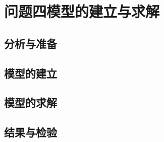 \section{问题四模型的建立与求解}

\subsection{分析与准备}

\subsection{模型的建立}

\subsection{模型的求解}

\subsection{结果与检验}
